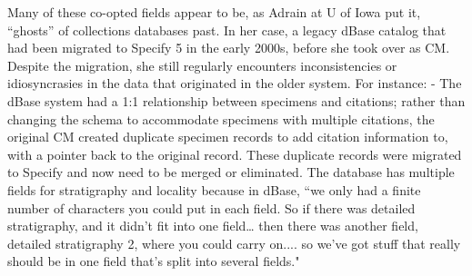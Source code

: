 Many of these co-opted fields appear to be, as Adrain at U of Iowa put it, “ghosts” of collections databases past.   In her case, a legacy dBase catalog that had been migrated to Specify 5 in the early 2000s, before she took over as CM. Despite the migration, she still regularly encounters inconsistencies or idiosyncrasies in the data that originated in the older system.  For instance:
-	The dBase system had a 1:1 relationship between specimens and citations; rather than changing the schema to accommodate specimens with multiple citations, the original CM created duplicate specimen records to add citation information to, with a pointer back to the original record.  These duplicate records were migrated to Specify and now need to be merged or eliminated.
The database has multiple fields for stratigraphy and locality because in dBase, “we only had a finite number of characters you could put in each field. So if there was detailed stratigraphy, and it didn't fit into one field… then there was another field, detailed stratigraphy 2, where you could carry on.... so we've got stuff that really should be in one field that's split into several fields."  




